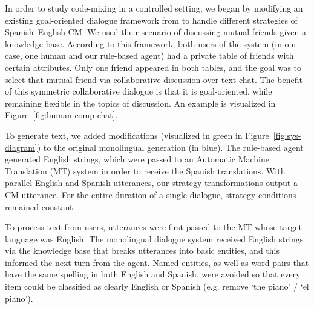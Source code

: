 \documentclass[11pt,a4paper]{article}
\newcommand{\yt}[1]{\textcolor{cyan}{\bf\small [#1 --YT]}}
\newcommand{\Fref}[1]{Figure~\ref{#1}}
\begin{document}
In order to study code-mixing in a controlled setting, we began by modifying an existing goal-oriented dialogue framework from \citet{He2017} to handle different strategies of Spanish--English CM.
We used their scenario of discussing mutual friends given a knowledge base. 
According to this framework, both users of the system (in our case, one human and our rule-based agent) had a private table of friends with certain attributes. 
Only one friend appeared in both tables, and the goal was to select that mutual friend via collaborative discussion over text chat.
The benefit of this symmetric collaborative dialogue is that it is goal-oriented, while remaining flexible in the topics of discussion.
An example is visualized in \Fref{fig:human-comp-chat}.

To generate text, we added modifications (visualized in green in \Fref{fig:sys-diagram}) to the original monolingual generation (in blue). 
The rule-based agent generated English strings, which were passed to an Automatic Machine Translation (MT) system in order to receive the Spanish translations. 
With parallel English and Spanish utterances, our strategy transformations output a CM utterance.
For the entire duration of a single dialogue, strategy conditions remained constant.

To process text from users, utterances were first passed to the MT whose target language was English.
The monolingual dialogue system received English strings via the knowledge base that breaks utterances into basic entities, and this informed the next turn from the agent.
Named entities, as well as word pairs that have the same spelling in both English and Spanish, were avoided so that every item could be classified as clearly English or Spanish (e.g. remove `the piano' / `el piano').
\end{document}
